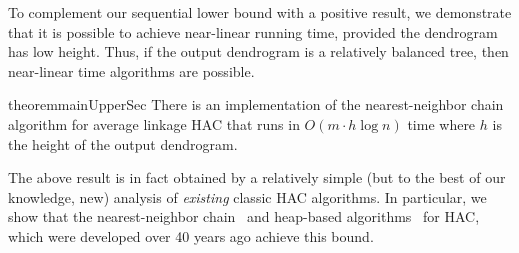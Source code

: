 \documentclass[11pt]{article}
\begin{document}
To complement our sequential lower bound with a positive result, we demonstrate that it is possible to achieve near-linear running time, provided the dendrogram has low height. Thus, if the output dendrogram is a relatively balanced tree, then near-linear time algorithms are possible.
\begin{restatable}{theorem}{mainUpperSec}\label{thm:mainUpperSeq}
    There is an implementation of the nearest-neighbor chain algorithm for average linkage HAC that runs in $O(m \cdot h \log n)$ time where $h$ is the height of the output dendrogram.
\end{restatable}
\noindent The above result is in fact obtained by a relatively simple (but to the best of our knowledge, new) analysis of {\em existing} classic HAC algorithms.
In particular, we show that the nearest-neighbor chain~\cite{benzecri, juan} and heap-based algorithms~\cite{irbook} for HAC, which were developed over 40 years ago achieve this bound. 



\end{document}
